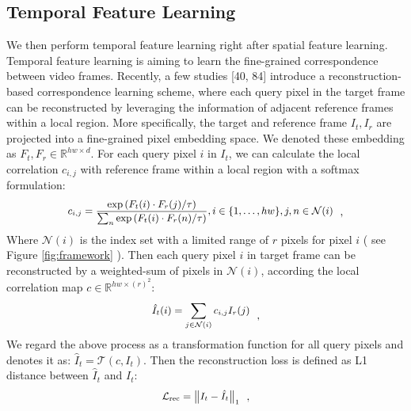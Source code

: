 \documentclass{article}
\begin{document}
\subsection{Temporal Feature Learning}
\label{temporal_feature_learning}
We then perform temporal feature learning right after spatial feature learning. Temporal feature learning is aiming to learn the fine-grained correspondence between video frames. Recently, a few studies [40, 84] introduce a reconstruction-based correspondence learning scheme, where each query pixel in the target frame can be reconstructed by leveraging the information of adjacent reference frames within a local region. More specifically, the target and reference frame $I_{t}, I_r$ are projected into a  fine-grained pixel embedding space. We denoted these embedding as $F_t,F_{r} \in \mathbb{R}^{hw \times d}$. For each query pixel $i$ in $I_{t}$, we can calculate the local correlation $c_{i,j}$ with reference frame within a local region with a softmax formulation:
\begin{equation}\label{eq:local_correlation}
  \small
  \begin{aligned}
    c_{i, j}=\frac{\exp \left(F_t(i)  \cdot F_r(j) / \tau\right)}{\sum_{n} \exp \left(F_t(i) \cdot F_r(n) / \tau\right)}, i \in \{1,\ldots,hw\}, j,n \in \mathcal{N}(i)
  \end{aligned}~~,
\end{equation}
Where $\mathcal{N}(i)$ is the index set with a limited range of $r$ pixels for pixel $i$ ( see Figure \ref{fig:framework} ). Then each query pixel $i$ in target frame can be reconstructed by a weighted-sum of pixels in $\mathcal{N}(i)$, according the local correlation map $c \in \mathbb{R}^{hw \times (r)^2}$:
\begin{equation}\label{eq:reconstruction}
  \small
  \begin{aligned}
    \hat{I}_{t}(i)=\sum_{j \in \mathcal{N}(i)} c_{i,j} I_{r}(j)
  \end{aligned}~~,
\end{equation}
We regard the above process as a transformation function for all query pixels and denotes it as: $\hat{I}_{t} = \mathcal{T}\left(c, I_t\right)$. Then the reconstruction loss is defined as L1 distance between $\hat{I}_{t}$ and $I_{t}$:
\begin{equation}\label{eq:reconstruction loss}
  \small
  \begin{aligned}
    \mathcal{L}_{\mathrm{rec}}=\left\|I_{t}-\hat{I}_{t}\right\|_{1}
  \end{aligned}~~,
\end{equation}
\end{document}

